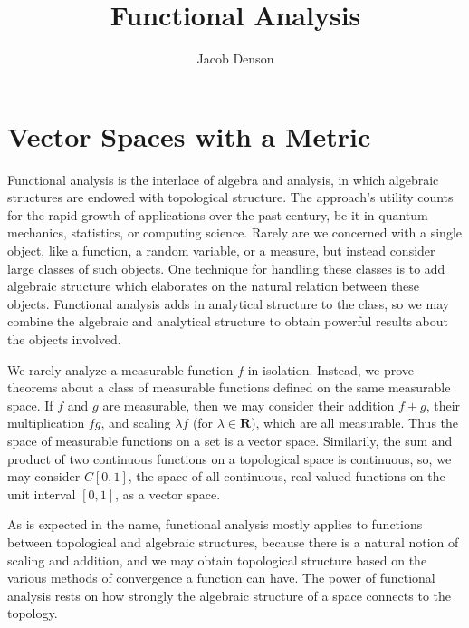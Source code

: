 

\title{Functional Analysis}
\author{Jacob Denson}



\maketitle
\tableofcontents
{}


\part{Vector Spaces with a Metric}

Functional analysis is the interlace of algebra and analysis, in which algebraic structures are endowed with topological structure. The approach's utility counts for the rapid growth of applications over the past century, be it in quantum mechanics, statistics, or computing science. Rarely are we concerned with a single object, like a function, a random variable, or a measure, but instead consider large classes of such objects. One technique for handling these classes is to add algebraic structure which elaborates on the natural relation between these objects. Functional analysis adds in analytical structure to the class, so we may combine the algebraic and analytical structure to obtain powerful results about the objects involved.

\begin{example}
    We rarely analyze a measurable function $f$ in isolation. Instead, we prove theorems about a class of measurable functions defined on the same measurable space. If $f$ and $g$ are measurable, then we may consider their addition $f + g$, their multiplication $fg$, and scaling $\lambda f$ (for $\lambda \in \mathbf{R}$), which are all measurable. Thus the space of measurable functions on a set is a vector space. Similarily, the sum and product of two continuous functions on a topological space is continuous, so, we may consider $C[0,1]$, the space of all continuous, real-valued functions on the unit interval $[0,1]$, as a vector space.
\end{example}

As is expected in the name, functional analysis mostly applies to functions between topological and algebraic structures, because there is a natural notion of scaling and addition, and we may obtain topological structure based on the various methods of convergence a function can have. The power of functional analysis rests on how strongly the algebraic structure of a space connects to the topology.

